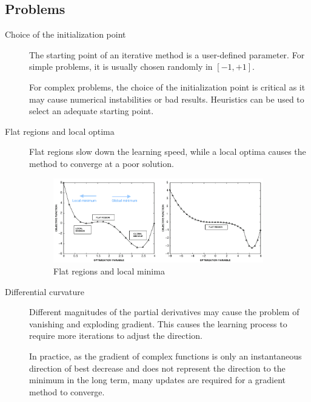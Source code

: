 \subsection{Problems}

\begin{description}
    \item[Choice of the initialization point] 
        The starting point of an iterative method is a user-defined parameter.
        For simple problems, it is usually chosen randomly in $[-1, +1]$.
        
        For complex problems, the choice of the initialization point is critical as 
        it may cause numerical instabilities or bad results.
        Heuristics can be used to select an adequate starting point.

    \item[Flat regions and local optima] 
        Flat regions slow down the learning speed,
        while a local optima causes the method to converge at a poor solution.
        \begin{figure}[H]
            \centering
            \includegraphics[width=0.9\textwidth]{img/_descent_local_flat.pdf}
            \caption{Flat regions and local minima}
        \end{figure}
    
    \item[Differential curvature]
        Different magnitudes of the partial derivatives may cause the problem of
        vanishing and exploding gradient. 
        This causes the learning process to require more iterations to adjust the direction.

        In practice, as the gradient of complex functions is only an instantaneous direction of best decrease and
        does not represent the direction to the minimum in the long term, 
        many updates are required for a gradient method to converge.


\end{description}
